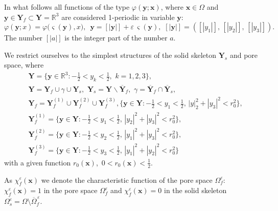 \documentclass{article}
\theoremstyle{plain}
\theoremstyle{definition}
\numberwithin{equation}{section}
\begin{document}
In what follows all functions of the type $\varphi(\boldsymbol{y};\boldsymbol{x})$, where $\boldsymbol{x}\in \Omega$ and $\boldsymbol{y}\in\textbf{Y}_{f}\subset\textbf{Y}=
\mathbb{R}^{3}$ are considered 1-periodic in variable $\boldsymbol{y}$:
\begin{equation*}
\varphi(\boldsymbol{y};x)=\varphi\big(\boldsymbol{\varsigma}(\boldsymbol{y}),x\big),\,\,\,
\boldsymbol{y}=[|\boldsymbol{y}|]+\varepsilon\,\boldsymbol{\varsigma}(\boldsymbol{y}),\,\,
[|\boldsymbol{y}|]=([|y_{1}|],\,[|y_{2}|],\,[|y_{3}|]).
\end{equation*}
The number $[|a|]$ is the integer part of the number $a$.

We restrict ourselves to the simplest structures of the solid skeleton $\textbf{Y}_{s}$ and pore space, where
\begin{equation*}
\begin{aligned}
& 
\textbf{Y}=\{\boldsymbol{y}\in\mathbb{R}^{3}:-\tfrac{1}{2}<y_{k}<\tfrac{1}{2},\,\,k=1,2,3\},
\\
& \textbf{Y}=\textbf{Y}_{f}\cup\gamma\cup\textbf{Y}_{s},
\,\,\textbf{Y}_{s}=\textbf{Y}\backslash\overline{\textbf{Y}}_{f},\,\,
\gamma=\overline{\textbf{Y}}_{f}\cap\overline{\textbf{Y}}_{s},
\\
& \textbf{Y}_{f}=\textbf{Y}^{(1)}_{f}\cup\textbf{Y}^{(2)}_{f}\cup\textbf{Y}^{(3)}_{f},
\{\boldsymbol{y}\in \textbf{Y}:-\tfrac{1}{2}<y_{1}<\tfrac{1}{2},\,|y|_{2}^{2}+|y_{3}|^{2}<r_{0}^{2}\},
\\
& \textbf{Y}^{(1)}_{f}=\{\boldsymbol{y}\in \textbf{Y}:
-\tfrac{1}{2}<y_{1}<\tfrac{1}{2},\,|y_{2}|^{2}+|y_{3}|^{2}<r_{0}^{2}\},
\\
& \textbf{Y}^{(2)}_{f}=\{\boldsymbol{y}\in \textbf{Y}:
-\tfrac{1}{2}<y_{2}<\tfrac{1}{2},\,|y_{1}|^{2}+|y_{3}|^{2}<r_{0}^{2}\},
\\
& \textbf{Y}^{(3)}_{f}=\{\boldsymbol{y}\in \textbf{Y}:-
\tfrac{1}{2}<y_{3}<\tfrac{1}{2},\,|y_{1}|^{2}+|y_{2}|^{2}<r_{0}^{2}\}
\end{aligned}
\end{equation*}
with a given function $r_{0}(\boldsymbol{x})$, $\displaystyle\,0<r_{0}(\boldsymbol{x})<\frac{1}{2}$.

As $\chi^{\varepsilon}_{f}(\boldsymbol{x})$ we denote the characteristic function of the pore space $\Omega^{\varepsilon}_{f}$: $\chi^{\varepsilon}_{f}(\boldsymbol{x})=1$ in the pore space $\Omega^{\varepsilon}_{f}$ and $\chi^{\varepsilon}_{f}(\boldsymbol{x})=0$ in the solid skeleton $\Omega^{\varepsilon}_{s}=\Omega\setminus\overline{\Omega}^{\,\varepsilon}_{f}$.
\end{document}
